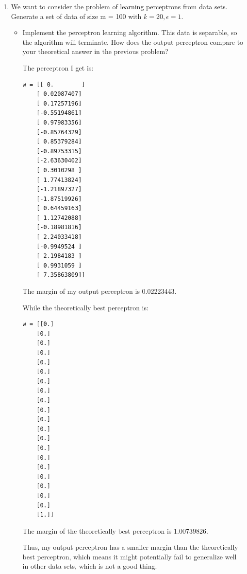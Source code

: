 \documentclass[letter, 12pt]{article}
\begin{document}
\begin{enumerate}
        \item {We want to consider the problem of learning perceptrons from data sets. Generate a set of data of size m = 100
            with $ k = 20, \epsilon = 1 $.}
        \begin{itemize}
            \item {Implement the perceptron learning algorithm. This data is separable, so the algorithm will terminate. How does the output perceptron compare to your theoretical answer in the previous problem?}
            \par{The perceptron I get is: }
            \begin{lstlisting}
w = [[ 0.        ]
    [ 0.02087407]
    [ 0.17257196]
    [-0.55194861]
    [ 0.97983356]
    [-0.85764329]
    [ 0.85379284]
    [-0.89753315]
    [-2.63630402]
    [ 0.3010298 ]
    [ 1.77413824]
    [-1.21897327]
    [-1.87519926]
    [ 0.64459163]
    [ 1.12742088]
    [-0.18981816]
    [ 2.24033418]
    [-0.9949524 ]
    [ 2.1984183 ]
    [ 0.9931059 ]
    [ 7.35863809]]
            \end{lstlisting}
            \par{The margin of my output perceptron is 0.02223443.}
            \par{While the theoretically best perceptron is:}
            \begin{lstlisting}
w = [[0.]
    [0.]
    [0.]
    [0.]
    [0.]
    [0.]
    [0.]
    [0.]
    [0.]
    [0.]
    [0.]
    [0.]
    [0.]
    [0.]
    [0.]
    [0.]
    [0.]
    [0.]
    [0.]
    [0.]
    [1.]]
            \end{lstlisting}
            \par{The margin of the theoretically best perceptron is 1.00739826.}
            \par{Thus, my output perceptron has a smaller margin than the theoretically best perceptron, which means it might potentially fail to generalize well in other data sets, which is not a good thing.}
        \end{itemize}
        

\end{enumerate}
\end{document}

